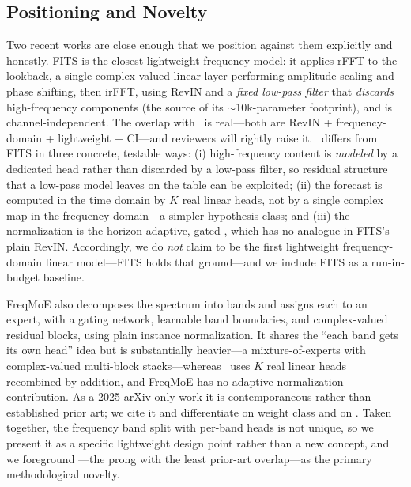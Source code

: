 \subsection{Positioning and Novelty}
\label{sec:related:positioning}

Two recent works are close enough that we position against them explicitly and
honestly. FITS \citep{xu2024fits} is the closest lightweight frequency model: it
applies rFFT to the lookback, a single complex-valued linear layer performing
amplitude scaling and phase shifting, then irFFT, using RevIN and a \emph{fixed
low-pass filter} that \emph{discards} high-frequency components (the source of
its $\sim$10k-parameter footprint), and is channel-independent. The overlap with
\method\ is real---both are RevIN + frequency-domain + lightweight + CI---and
reviewers will rightly raise it. \method\ differs from FITS in three concrete,
testable ways: (i) high-frequency content is \emph{modeled} by a dedicated head
rather than discarded by a low-pass filter, so residual structure that a low-pass
model leaves on the table can be exploited; (ii) the forecast is computed in the
time domain by $K$ real linear heads, not by a single complex map in the
frequency domain---a simpler hypothesis class; and (iii) the normalization is the
horizon-adaptive, gated \arevin, which has no analogue in FITS's plain RevIN.
Accordingly, we do \emph{not} claim to be the first lightweight frequency-domain
linear model---FITS holds that ground---and we include FITS as a run-in-budget
baseline.

FreqMoE \citep{liu2025freqmoe} also decomposes the spectrum into bands and
assigns each to an expert, with a gating network, learnable band boundaries, and
complex-valued residual blocks, using plain instance normalization. It shares the
``each band gets its own head'' idea but is substantially heavier---a
mixture-of-experts with complex-valued multi-block stacks---whereas \method\ uses
$K$ real linear heads recombined by addition, and FreqMoE has no adaptive
normalization contribution. As a 2025 arXiv-only work it is contemporaneous
rather than established prior art; we cite it and differentiate on weight class
and on \arevin. Taken together, the frequency band split with per-band heads is
not unique, so we present it as a specific lightweight design point rather than a
new concept, and we foreground \arevin---the prong with the least prior-art
overlap---as the primary methodological novelty.

